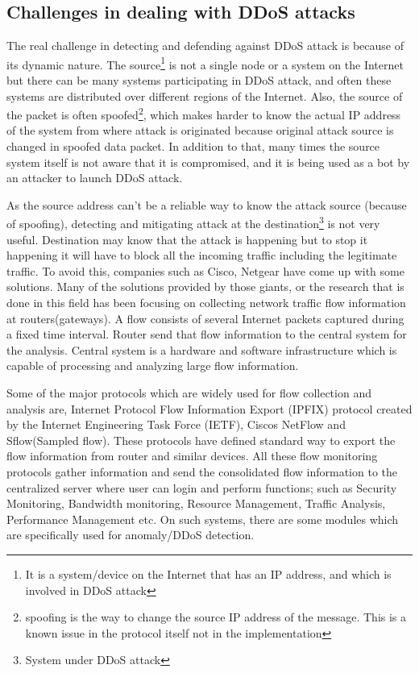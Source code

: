 \documentclass[12pt,oneside,a4paper]{article}
\begin{document}
\subsection{Challenges in dealing with DDoS attacks}
The real challenge in detecting and defending against DDoS attack is because of its dynamic nature. The source\footnote{It is a system/device on the Internet that has an IP address, and which is involved in DDoS attack} is not a single node or a system on the Internet but there can be many systems participating in DDoS attack, and often these systems are distributed over different regions of the Internet. Also, the source of the packet is often spoofed\footnote{spoofing is the way to change the source IP address of the message. This is a known issue in the protocol itself not in the implementation}\cite{ip-spoofing}, which makes harder to know the actual IP address of the system from where attack is originated because original attack source is changed in spoofed data packet. In addition to that, many times the source system itself is not aware that it is compromised, and it is being used as a bot\cite{bot} by an attacker to launch DDoS attack.

As the source address can't be a reliable way to know the attack source (because of spoofing), detecting and mitigating attack at the destination\footnote{System under DDoS attack} is not very useful. Destination may know that the attack is happening but to stop it happening it will have to block all the incoming traffic including the legitimate traffic. To avoid this, companies such as Cisco, Netgear have come up with some solutions. Many of the solutions provided by those giants, or the research that is done in this field has been focusing on collecting network traffic flow information\cite{network-traffic-flow} at routers(gateways). A flow consists of several Internet packets captured during a fixed time interval. Router send that flow information to the central system for the analysis. Central system is a hardware and software infrastructure which is capable of processing and analyzing large flow information.\par

Some of the major protocols which are widely used for flow collection and analysis are, Internet Protocol Flow Information Export (IPFIX) protocol created by the Internet Engineering Task Force (IETF), Ciscos NetFlow\cite{cisco-netflow} and Sflow(Sampled flow)\cite{sflow}. These protocols have defined standard way to export the flow information from router and similar devices. All these flow monitoring protocols gather information and send the consolidated flow information to the centralized server where user can login and perform functions; such as Security Monitoring, Bandwidth monitoring, Resource Management, Traffic Analysis, Performance Management etc. On such systems, there are some modules which are specifically used for anomaly/DDoS detection.\par
\end{document}
